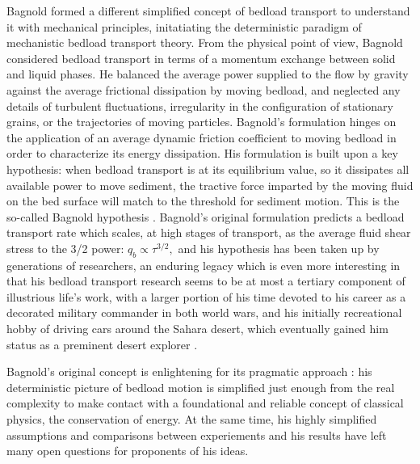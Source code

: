\documentclass{article}
\begin{document}
Bagnold formed a different simplified concept of bedload transport to understand it with mechanical principles, initatiating the deterministic paradigm of mechanistic bedload transport theory. 
From the physical point of view, Bagnold considered bedload transport in terms of a momentum exchange between solid and liquid phases.
He balanced the average power supplied to the flow by gravity against the average frictional dissipation by moving bedload, and neglected any details of turbulent fluctuations, irregularity in the configuration of stationary grains, or the trajectories of moving particles.
Bagnold's formulation hinges on the application of an average dynamic friction coefficient to moving bedload in order to characterize its energy dissipation. 
His formulation is built upon a key hypothesis: when bedload transport is at its equilibrium value, so it dissipates all available power to move sediment, the tractive force imparted by the moving fluid on the bed surface will match to the threshold for sediment motion. 
This is the so-called Bagnold hypothesis \citep{Engelund1976, Luque1976, Seminara2002, Ancey2006}.
Bagnold's original formulation predicts a bedload transport rate which scales, at high stages of transport, as the average fluid shear stress to the 3/2 power: $q_b \propto \tau^{3/2},$ and his hypothesis has been taken up by generations of researchers, an enduring legacy which is even more interesting in that his bedload transport research seems to be at most a tertiary component of illustrious life's work, with a larger portion of his time devoted to his career as a decorated military commander in both world wars, and his initially recreational hobby of driving cars around the Sahara desert, which eventually gained him status as a preminent desert explorer \citep{Bagnold1988}. 

Bagnold's original concept is enlightening for its pragmatic approach \citep{Ashida1972, Bagnold1973, Engelund1976, Luque1976}: his deterministic picture of bedload motion is simplified just enough from the real complexity to make contact with a foundational and reliable concept of classical physics, the conservation of energy. 
At the same time, his highly simplified assumptions and comparisons between experiements and his results have left many open questions for proponents of his ideas. 
\end{document}
